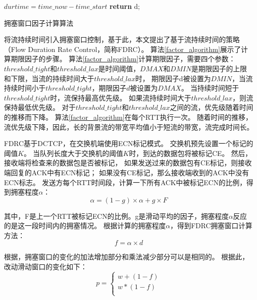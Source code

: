 \begin{algorithm}
 $durtime=time\_now-time\_start$\;
   \textbf{return} d;
\caption{拥塞窗口因子计算算法}
\label{factor_algorithm}
\end{algorithm}

将流持续时间引入拥塞窗口控制，基于此，本文提出了基于流持续时间的策略（Flow Duration Rate Control，简称FDRC）。
算法\ref{factor_algorithm}展示了计算期限因子的步骤。
算法\ref{factor_algorithm}计算期限因子，需要四个参数： 
$threshold\_tight$和$threshold\_lax$是时间阈值，$DMAX$和$DMIN$是期限因子的上限和下限，当流的持续时间大于$threshold\_lax$时，
期限因子d被设置为$DMIN$，当流持续时间小于$threshold\_tight$，期限因子$d$被设置为$DMAX$。
当持续时间短于$threshold\_tight$时，流保持最高优先级。
如果流持续时间大于$threshold\_lax$，则流保持最低优先级。
对于$threshold\_tight$和$threshold\_lax$之间的流，优先级随着时间的推移而下降。
算法\ref{factor_algorithm}在每个RTT执行一次。
随着时间的推移，流优先级下降，因此，长的背景流的带宽平均值小于短流的带宽，流完成时间长。

FDRC基于DCTCP，在交换机端使用ECN标记模式。
交换机预先设置一个标记的阈值$K$。
当队列长度大于交换机的阈值$K$时，到达的数据包将被标记CE。
然后，接收端将检查来的数据包是否被标记，
如果发送过来的数据包有CE标记，则接收端回复的ACK中有ECN标记；
如果没有CE标记，那么接收端收到的ACK中没有ECN标志。
发送方每个RTT时间段，计算一下所有ACK中被标记ECN的比例，得到拥塞程度$\alpha$：
\begin{equation}
\label{alpha}
\alpha=(1-g) \times \alpha+g\times F
\end{equation}

其中，F是上一个RTT被标记ECN的比例。g是滑动平均的因子，拥塞程度$\alpha$反应的是这一段时间内的拥塞情况。
 根据计算的拥塞程度$\alpha$，得到FDRC拥塞窗口计算方法：
\begin{equation}
\label{factor}
f=\alpha \times d
\end{equation}

根据\cite{LPD}，拥塞窗口的变化的加法增加部分和乘法减少部分可以是相同的。
根据此，改动滑动窗口的变化如下：
\begin{equation}
\label{ca}
 p=\left\{
\begin{array}{rcl}
w+(1-f)\\
w*(1-f) \\
\end{array} \right. 
\end{equation}


